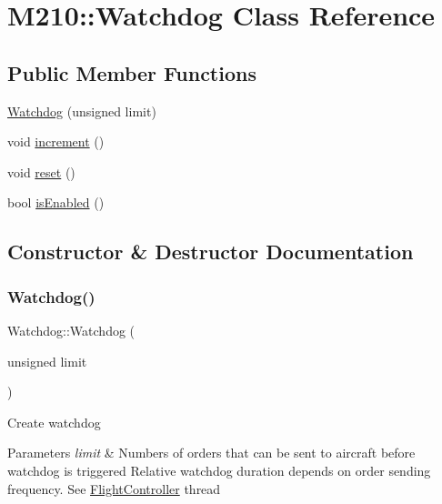 \hypertarget{class_m210_1_1_watchdog}{}\section{M210\+:\+:Watchdog Class Reference}
\label{class_m210_1_1_watchdog}
\subsection*{Public Member Functions}
\begin{DoxyCompactItemize}
\item 
\mbox{\hyperlink{class_m210_1_1_watchdog_a4a992183689c0800d586f6a6daacc7b4}{Watchdog}} (unsigned limit)
\item 
void \mbox{\hyperlink{class_m210_1_1_watchdog_a4342960b3b6881def5dc2342fee990ba}{increment}} ()
\item 
void \mbox{\hyperlink{class_m210_1_1_watchdog_ad64f941736836164bf9049ead5ca31b2}{reset}} ()
\item 
bool \mbox{\hyperlink{class_m210_1_1_watchdog_a235a91f4745f75bd5222ecc57d01f9ef}{is\+Enabled}} ()
\end{DoxyCompactItemize}


\subsection{Constructor \& Destructor Documentation}
\mbox{\label{class_m210_1_1_watchdog_a4a992183689c0800d586f6a6daacc7b4}} 
\subsubsection{\texorpdfstring{Watchdog()}{Watchdog()}}
{\footnotesize\ttfamily Watchdog\+::\+Watchdog (\begin{DoxyParamCaption}\item[{unsigned}]{limit }\end{DoxyParamCaption})\hspace{0.3cm}{\ttfamily [explicit]}}

Create watchdog 
\begin{DoxyParams}{Parameters}
{\em limit} & Numbers of orders that can be sent to aircraft before watchdog is triggered Relative watchdog duration depends on order sending frequency. See \mbox{\hyperlink{class_m210_1_1_flight_controller}{Flight\+Controller}} thread \\
\hline
\end{DoxyParams}


